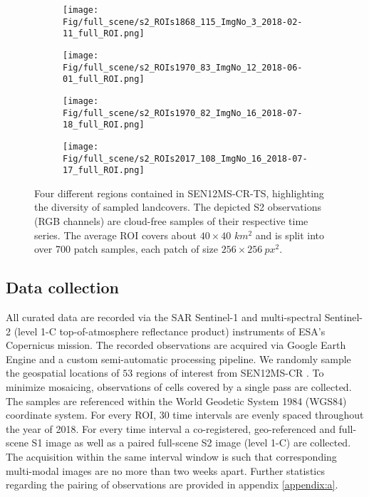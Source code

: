 \documentclass[journal]{IEEEtran}
\begin{document}
\begin{figure*}[h!tb]
  \centering
  \begin{subfigure}[b]{0.49\linewidth}
    \texttt{[image: Fig/full\_scene/s2\_ROIs1868\_115\_ImgNo\_3\_2018-02-11\_full\_ROI.png]}
  \end{subfigure}
    \begin{subfigure}[b]{0.49\linewidth}
    \texttt{[image: Fig/full\_scene/s2\_ROIs1970\_83\_ImgNo\_12\_2018-06-01\_full\_ROI.png]}
  \end{subfigure}
  \label{fig:coffee}
  \begin{subfigure}[b]{0.49\linewidth}
    \texttt{[image: Fig/full\_scene/s2\_ROIs1970\_82\_ImgNo\_16\_2018-07-18\_full\_ROI.png]}
  \end{subfigure}
    \begin{subfigure}[b]{0.49\linewidth}
    \texttt{[image: Fig/full\_scene/s2\_ROIs2017\_108\_ImgNo\_16\_2018-07-17\_full\_ROI.png]}
  \end{subfigure}
  \caption{Four different regions contained in SEN12MS-CR-TS, highlighting the diversity of sampled landcovers. The depicted S2 observations (RGB channels) are cloud-free samples of their respective time series. The average ROI covers about $40 \times 40$ $km^2$ and is split into over 700 patch samples, each patch of size $256 \times 256 \: px^2$.}
  \label{fig:diverseROI}
\end{figure*}

\subsection{Data collection} \label{curation}

All curated data are recorded via the SAR Sentinel-1 and multi-spectral Sentinel-2 (level 1-C top-of-atmosphere reflectance product) instruments of ESA's Copernicus mission. The recorded observations are acquired via Google Earth Engine \cite{gorelick2017google} and a custom semi-automatic processing pipeline. We randomly sample the geospatial locations of $53$ regions of interest from SEN12MS-CR \cite{ebel2020multisensor}. To minimize mosaicing, observations of cells covered by a single pass are collected. The samples are referenced within the World Geodetic System 1984 (WGS84) coordinate system. For every ROI, 30 time intervals are evenly spaced throughout the year of 2018. For every time interval a co-registered, geo-referenced and full-scene S1 image as well as a paired full-scene S2 image (level 1-C) are collected. The acquisition within the same interval window is such that corresponding multi-modal images are no more than two weeks apart. Further statistics regarding the pairing of observations are provided in appendix \ref{appendix:a}.
\end{document}
